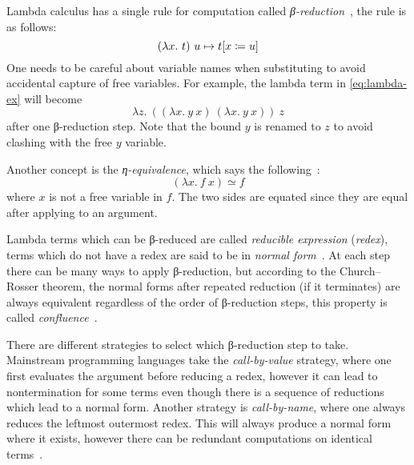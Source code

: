 Lambda calculus has a single rule for computation called
\emph{β-reduction}~\cite{functional-Hudak, functional-Barendregt, lambda-Revesz,
  lambda-Hindley, lambda-Barendregt}, the rule is as follows:
\begin{equation}
  (\lambda x.\ t)\ u \mapsto t[x \coloneqq u]
  \label{eq:beta}
\end{equation}
One needs to be careful about variable names when substituting to avoid
accidental capture of free variables. For example, the lambda term in
\cref{eq:lambda-ex} will become
\begin{equation}
  \lambda z.\ ((\lambda x.\ y\ x)\ (\lambda x.\ y\ x))\ z
  \label{eq:lambda-ex-beta}
\end{equation}
after one β-reduction step. Note that the bound \(y\) is renamed to \(z\) to
avoid clashing with the free \(y\) variable.

Another concept is the \emph{η-equivalence}, which says the
following~\cite{functional-Hudak, lambda-Revesz, lambda-Hindley,
  lambda-Barendregt}:
\begin{equation}
  (\lambda x.\ f\ x) \simeq f
\end{equation}
where \(x\) is not a free variable in \(f\). The two sides are equated since
they are equal after applying to an argument.

Lambda terms which can be β-reduced are called \emph{reducible expression}
(\emph{redex}), terms which do not have a redex are said to be in \emph{normal
  form}~\cite{functional-Hudak, functional-Barendregt, lambda-Revesz,
  lambda-Hindley, lambda-Barendregt}. At each step there can be many ways to apply
β-reduction, but according to the Church{--}Rosser theorem, the normal forms
after repeated reduction (if it terminates) are always equivalent regardless of
the order of β-reduction steps, this property is called
\emph{confluence}~\cite{functional-Hudak, lambda-Revesz, lambda-Hindley,
  lambda-Barendregt}.

There are different strategies to select which β-reduction step to take.
Mainstream programming languages take the \emph{call-by-value} strategy, where
one first evaluates the argument before reducing a redex, however it can lead to
nontermination for some terms even though there is a sequence of reductions
which lead to a normal form. Another strategy is \emph{call-by-name}, where one
always reduces the leftmost outermost redex. This will always produce a normal
form where it exists, however there can be redundant computations on identical
terms~\cite{functional-Hudak}.


